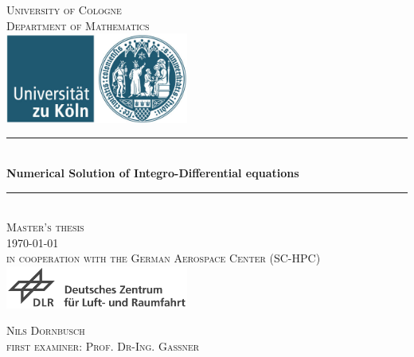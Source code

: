 \documentclass[12pt,a4paper,twoside, open=right]{scrreprt}
\theoremstyle{definition}
\theoremstyle{plain}
\begin{document}
\begin{titlepage}
\pagestyle{empty}
\begin{center}
\newcommand{\HRule}{\rule{\linewidth}{0.7mm}}
\textsc{\LARGE University of Cologne }\\ [0.4cm]
\textsc{ Department of Mathematics} \\[1.5cm]
\includegraphics[width=0.45\textwidth]{uni}\\[1.5cm]  %
\HRule \\[0.4cm]
{ \huge \bfseries Numerical Solution of Integro-Differential equations}\\[0.4cm]
\HRule \\[1cm]
\textsc{\Large Master's thesis}\\[2mm]
\textsc{\today}\\[10mm]
\textsc{in cooperation with the German Aerospace Center (SC-HPC)}\\[1.0cm]
\includegraphics[width=0.45\textwidth]{DLR-Logo-full}\\[1.0cm]


  




\begin{center}

\textsc{\Large Nils Dornbusch} \\[3pt]
\textsc{\Large first examiner: Prof. Dr-Ing. Gassner}
\end{center}
\end{center}
\end{titlepage}
\end{document}
